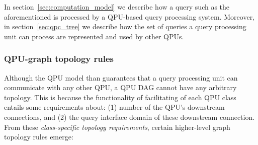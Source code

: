 In section~\ref{sec:computation_model} we describe how a query such as the aforementioned is processed by a QPU-based
query processing system.
Moreover, in section~\ref{sec:qpc_tree} we describe how the set of queries a query processing unit can process are
represented and used by other QPUs.

\subsubsection{QPU-graph topology rules}
\label{sec:graph_topology}
Although the QPU model than guarantees that a query processing unit can communicate with any other QPU,
a QPU DAG cannot have any arbitrary topology.
This is because the functionality of facilitating of each QPU class entails some requirements about:
(1) number of the QPU's downstream connections, and (2) the query interface domain of these downstream connection.
From these \textit{class-specific topology requirements}, certain higher-level graph topology rules emerge:
